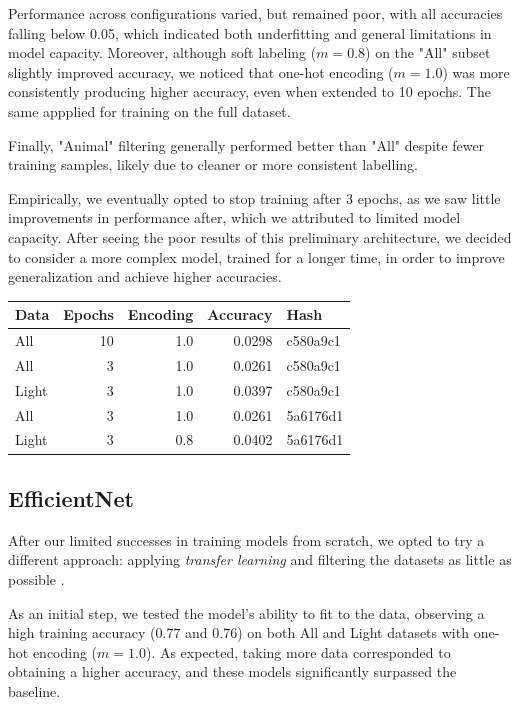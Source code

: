 \documentclass[10pt]{article}
\begin{document}
Performance across configurations varied, but remained poor, with all accuracies falling below 0.05, which indicated both underfitting and general limitations in model capacity. Moreover, although soft labeling ($m=0.8$) on the "All" subset slightly improved accuracy, we noticed that one-hot encoding ($m=1.0$) was more consistently producing higher accuracy, even when extended to 10 epochs. The same appplied for training on the full dataset.

Finally, "Animal" filtering generally performed better than "All" despite fewer training samples, likely due to cleaner or more consistent labelling.

\begin{minipage}{0.48\linewidth}
Empirically, we eventually opted to stop training after 3 epochs, as we saw little improvements in performance after, which we attributed to limited model capacity. After seeing the poor results of this preliminary architecture, we decided to consider a more complex model, trained for a longer time, in order to improve generalization and achieve higher accuracies.
\end{minipage}
\hfill
\begin{minipage}{0.48\linewidth}
\centering
\begin{tabular}{|l|r|r|r|l|}
\hline
Data  & Epochs & Encoding & Accuracy & Hash     \\
\hline
All    & 10     & 1.0      & 0.0298   & c580a9c1 \\
All    & 3      & 1.0      & 0.0261   & c580a9c1 \\
Light  & 3      & 1.0      & 0.0397   & c580a9c1 \\
All    & 3      & 1.0      & 0.0261   & 5a6176d1 \\
Light  & 3      & 0.8      & 0.0402   & 5a6176d1 \\
\hline
\end{tabular}
\end{minipage}
\subsection*{EfficientNet}

After our limited successes in training models from scratch, we opted to try a different approach: applying \emph{transfer learning} and filtering the datasets as little as possible \cite{efficientnet}.

As an initial step, we tested the model's ability to fit to the data, observing a high training accuracy ($0.77$ and $0.76$) on both All and Light datasets with one-hot encoding ($m=1.0$). As expected, taking more data corresponded to obtaining a higher accuracy, and these models significantly surpassed the baseline.
\end{document}
